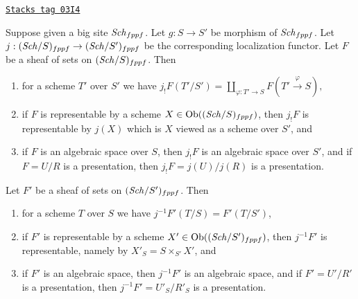 \begin{lemma}
\label{spaces-lemma-change-base-scheme}
\href{https://stacks.math.columbia.edu/tag/03I4}{\texttt{Stacks tag 03I4}}

Suppose given a big site $\mathit{Sch}_{fppf}$.
Let $g : S \to S'$ be morphism of $\mathit{Sch}_{fppf}$.
Let $j : (\mathit{Sch}/S)_{fppf} \to (\mathit{Sch}/S')_{fppf}$ be
the corresponding localization functor.
Let $F$ be a sheaf of sets on $(\mathit{Sch}/S)_{fppf}$.
Then
\begin{enumerate}
\item for a scheme $T'$ over $S'$ we have
$j_!F(T'/S') =
\coprod\nolimits_{\varphi : T' \to S} F(T' \xrightarrow{\varphi} S),$
\item if $F$ is representable by a scheme
$X \in \operatorname{Ob}((\mathit{Sch}/S)_{fppf})$,
then $j_!F$ is representable by $j(X)$ which is
$X$ viewed as a scheme over $S'$, and
\item if $F$ is an algebraic space over $S$, then $j_!F$ is an algebraic
space over $S'$, and if $F = U/R$ is a presentation, then
$j_!F = j(U)/j(R)$ is a presentation.
\end{enumerate}
Let $F'$ be a sheaf of sets on $(\mathit{Sch}/S')_{fppf}$. Then
\begin{enumerate}
\item[(4)] for a scheme $T$ over $S$ we have $j^{-1}F'(T/S) = F'(T/S')$,
\item[(5)] if $F'$ is representable by a scheme
$X' \in \operatorname{Ob}((\mathit{Sch}/S')_{fppf})$, then
$j^{-1}F'$ is representable, namely by $X'_S = S \times_{S'} X'$, and
\item[(6)] if $F'$ is an algebraic space, then
$j^{-1}F'$ is an algebraic space, and if $F' = U'/R'$ is a presentation,
then $j^{-1}F' = U'_S/R'_S$ is a presentation.
\end{enumerate}
\end{lemma}


